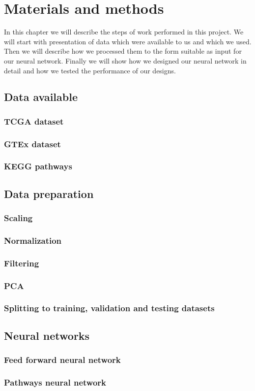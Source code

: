 \chapter{Materials and methods}
In this chapter we will describe the steps of work performed in this project.
We will start with presentation of data which were available to us and which we used.
Then we will describe how we processed them to the form suitable as input for our neural network.
Finally we will show how we designed our neural network in detail and how we tested the performance of our designs.

\section{Data available}
\subsection{TCGA dataset}
\subsection{GTEx dataset}
\subsection{KEGG pathways}

\section{Data preparation}
\subsection{Scaling}
\subsection{Normalization}
\subsection{Filtering}
\subsection{PCA}
\subsection{Splitting to training, validation and testing datasets}

\section{Neural networks}
\subsection{Feed forward neural network}
\subsection{Pathways neural network}

